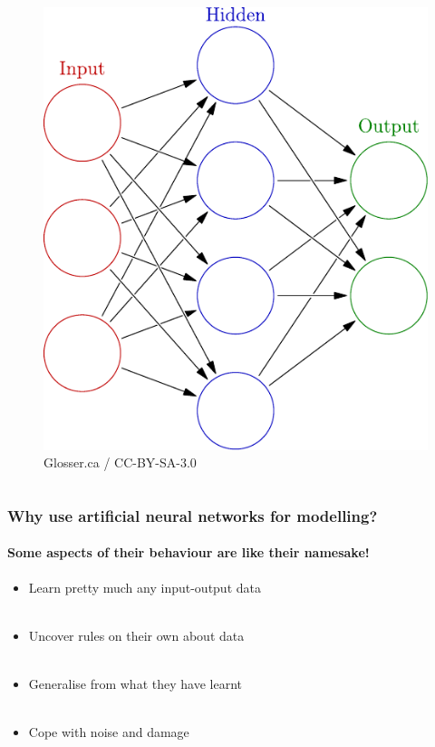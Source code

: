 \documentclass{beamer}
\newcommand{\figheight}{0.72\textheight}
\begin{document}
\begin{frame}
\begin{columns}[T]
\begin{column}{.55\textwidth}
\begin{figure}[t]
\begin{flushleft}
 \includegraphics[height = \figheight]{./fig/3-layer.pdf}
 \end{flushleft}
 \caption{Glosser.ca / CC-BY-SA-3.0}
\end{figure}
\end{column}

\end{columns}
\end{frame}




\begin{frame}
\frametitle{Why use artificial neural networks for modelling?}
\framesubtitle{Some aspects of their behaviour are like their namesake!}
\begin{itemize}[<+->]
\item Learn pretty much any input-output data \\ \
 \item Uncover rules on their own about data  \\ \
\item Generalise from what they have learnt \\ \
\item Cope with noise and damage \\ \
\end{itemize}
\end{frame}
\end{document}
